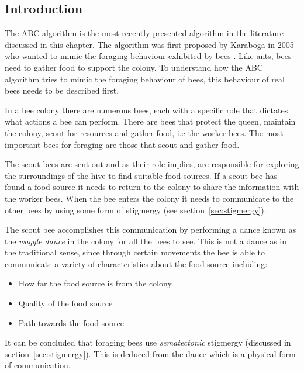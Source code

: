 \subsection{Introduction}
The \gls{ABC} algorithm is the most recently presented algorithm in the literature discussed in this chapter\cite{ABCCompareStudy,ABCLeafConstrained,ABCNumericalOptimization}. The algorithm was first proposed by Karaboga in 2005 who wanted to mimic the foraging behaviour exhibited by bees \cite{ABCCompareStudy,ABCLeafConstrained,ABCNumericalOptimization}. Like ants, bees need to gather food to support the colony. To understand how the \gls{ABC} algorithm tries to mimic the foraging behaviour of bees, this behaviour of real bees needs to be described first\cite{ABCCompareStudy}. 

In a bee colony there are numerous bees, each with a specific role that dictates what actions a bee can perform. There are bees that protect the queen, maintain the colony, scout for resources and gather food, i.e the worker bees. The most important bees for foraging are those that scout and gather food\cite{ABCCompareStudy}. 

The scout bees are sent out and as their role implies, are responsible for exploring the surroundings of the hive to find suitable food sources\cite{ABCCompareStudy}. If a scout bee has found a food source it needs to return to the colony to share the information with the worker bees\cite{ABCCompareStudy}. When the bee enters the colony it needs to communicate to the other bees by using some form of stigmergy (see section~\ref{sec:stigmergy})\cite{ABCCompareStudy}.

The scout bee accomplishes this communication by performing a dance known as the \emph{waggle dance} in the colony for all the bees to see\cite{ABCCompareStudy}. This is not a dance as in the traditional sense, since through certain movements the bee is able to communicate a variety of characteristics about the food source including\cite{ABCCompareStudy}:
\begin{itemize}
\item How far the food source is from the colony
\item Quality of the food source
\item Path towards the food source
\end{itemize}

It can be concluded that foraging bees use \emph{sematectonic} stigmergy (discussed in section~\ref{sec:stigmergy}). This is deduced from the dance which is a physical form of communication.

